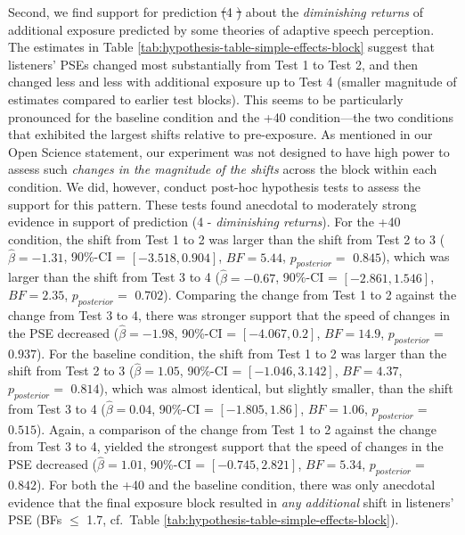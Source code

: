 \documentclass[
  11pt,
  man,mask,floatsintext]{apa6}
\makeatletter
\providecommand{\DIFdel}[1]{{\protect\color{red}\sout{#1}}} %
\providecommand{\DIFdelbegin}{} %
\providecommand{\DIFdelend}{} %
\newcommand{\DIFscaledelfig}{0.5}
\newlength{\DIFdelgraphicswidth} %
\newlength{\DIFdelgraphicsheight} %
\newcommand{\DIFdelincludegraphics}[2][]{%
\sbox{\DIFdelgraphicsbox}{\DIFOincludegraphics[#1]{#2}}%
\settoboxwidth{\DIFdelgraphicswidth}{\DIFdelgraphicsbox} %
\settoboxtotalheight{\DIFdelgraphicsheight}{\DIFdelgraphicsbox} %
\scalebox{\DIFscaledelfig}{%
\parbox[b]{\DIFdelgraphicswidth}{\usebox{\DIFdelgraphicsbox}\\[-\baselineskip] \rule{\DIFdelgraphicswidth}{0em}}\llap{\resizebox{\DIFdelgraphicswidth}{\DIFdelgraphicsheight}{%
\setlength{\unitlength}{\DIFdelgraphicswidth}%
\begin{picture}(1,1)%
\thicklines\linethickness{2pt} %
{\color[rgb]{1,0,0}\put(0,0){\framebox(1,1){}}}%
{\color[rgb]{1,0,0}\put(0,0){\line( 1,1){1}}}%
{\color[rgb]{1,0,0}\put(0,1){\line(1,-1){1}}}%
\end{picture}%
}\hspace*{3pt}}} %
} %
\DeclareRobustCommand{\DIFdelbegin}{\DIFOdelbegin \let\includegraphics\DIFdelincludegraphics} %
\DeclareRobustCommand{\DIFdelend}{\DIFOaddend \let\includegraphics\DIFOincludegraphics} %
\let\sout@orig\sout %
\renewcommand{\sout}[1]{\ifmmode\text{\sout@orig{\ensuremath{#1}}}\else\sout@orig{#1}\fi} %
\makeatother
\begin{document}
Second, we find support for prediction \DIFdelbegin \DIFdel{(}\DIFdelend 4 \DIFdelbegin \DIFdel{) }\DIFdelend about the \emph{diminishing returns} of additional exposure predicted by some theories of adaptive speech perception. The estimates in Table \ref{tab:hypothesis-table-simple-effects-block} suggest that listeners' PSEs changed most substantially from Test 1 to Test 2, and then changed less and less with additional exposure up to Test 4 (smaller magnitude of estimates compared to earlier test blocks). This seems to be particularly pronounced for the baseline condition and the +40 condition---the two conditions that exhibited the largest shifts relative to pre-exposure. As mentioned in our Open Science statement, our experiment was not designed to have high power to assess such \emph{changes in the magnitude of the shifts} across the block within each condition. We did, however, conduct post-hoc hypothesis tests to assess the support for this pattern. These tests found anecdotal to moderately strong evidence in support of prediction (4 - \emph{diminishing returns}). For the +40 condition, the shift from Test 1 to 2 was larger than the shift from Test 2 to 3 (\(\hat{\beta} = -1.31\), 90\%-CI = \([-3.518, 0.904]\), \(BF = 5.44\), \(p_{posterior} =\) \(0.845\)), which was larger than the shift from Test 3 to 4 (\(\hat{\beta} = -0.67\), 90\%-CI = \([-2.861, 1.546]\), \(BF = 2.35\), \(p_{posterior} =\) \(0.702\)). Comparing the change from Test 1 to 2 against the change from Test 3 to 4, there was stronger support that the speed of changes in the PSE decreased (\(\hat{\beta} = -1.98\), 90\%-CI = \([-4.067, 0.2]\), \(BF = 14.9\), \(p_{posterior} =\) \(0.937\)). For the baseline condition, the shift from Test 1 to 2 was larger than the shift from Test 2 to 3 (\(\hat{\beta} = 1.05\), 90\%-CI = \([-1.046, 3.142]\), \(BF = 4.37\), \(p_{posterior} =\) \(0.814\)), which was almost identical, but slightly smaller, than the shift from Test 3 to 4 (\(\hat{\beta} = 0.04\), 90\%-CI = \([-1.805, 1.86]\), \(BF = 1.06\), \(p_{posterior} =\) \(0.515\)). Again, a comparison of the change from Test 1 to 2 against the change from Test 3 to 4, yielded the strongest support that the speed of changes in the PSE decreased (\(\hat{\beta} = 1.01\), 90\%-CI = \([-0.745, 2.821]\), \(BF = 5.34\), \(p_{posterior} =\) \(0.842\)). For both the +40 and the baseline condition, there was only anecdotal evidence that the final exposure block resulted in \emph{any additional} shift in listeners' PSE (BFs \(\leq\) 1.7, cf.~Table \ref{tab:hypothesis-table-simple-effects-block}).
\end{document}
